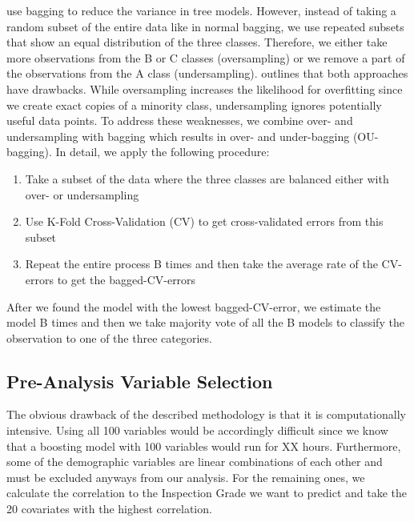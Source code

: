 \documentclass[11pt]{article}
\begin{document}
\citet[p. ]{James} use bagging to reduce the variance in tree models. However, instead of taking a random subset of the entire data like in normal bagging, we use repeated subsets that show an equal distribution of the three classes. Therefore, we either take more observations from the B or C classes (oversampling) or we remove a part of the observations from the A class (undersampling). \citet[p. 83]{imbalance} outlines that both approaches have drawbacks. While oversampling increases the likelihood for overfitting since we create exact copies of a minority class, undersampling ignores potentially useful data points. To address these weaknesses, we combine over- and undersampling with bagging which results in over- and under-bagging (OU-bagging). In detail, we apply the following procedure:
\begin{enumerate}
\item Take a subset of the data where the three classes are balanced either with over- or undersampling
\item Use K-Fold Cross-Validation (CV) to get cross-validated errors from this subset
\item Repeat the entire process B times and then take the average rate of the CV-errors to get the bagged-CV-errors
\end{enumerate}
After we found the model with the lowest bagged-CV-error, we estimate the model B times and then we take majority vote of all the B models to classify the observation to one of the three categories.

\subsection{Pre-Analysis Variable Selection}
The obvious drawback of the described methodology is that it is computationally intensive. Using all 100 variables would be accordingly difficult since we know that a boosting model with 100 variables would run for XX hours. Furthermore, some of the demographic variables are linear combinations of each other and must be excluded anyways from our analysis. For the remaining ones, we calculate the correlation to the Inspection Grade we want to predict and take the 20 covariates with the highest correlation.
\end{document}
